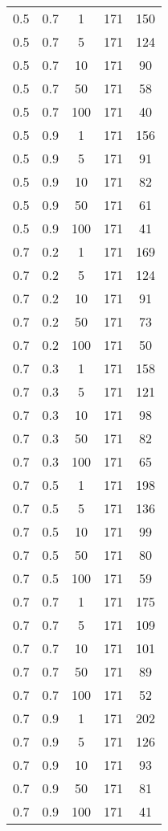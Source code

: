 \begin{appendices}
\begin{longtable}{|c|c|c|c|c|}
		0.5 & 0.7 & 1   & 171 & 150 \\
		0.5 & 0.7 & 5   & 171 & 124 \\
		0.5 & 0.7 & 10  & 171 & 90  \\
		0.5 & 0.7 & 50  & 171 & 58  \\
		0.5 & 0.7 & 100 & 171 & 40  \\ \hline
		0.5 & 0.9 & 1   & 171 & 156 \\
		0.5 & 0.9 & 5   & 171 & 91  \\
		0.5 & 0.9 & 10  & 171 & 82  \\
		0.5 & 0.9 & 50  & 171 & 61  \\
		0.5 & 0.9 & 100 & 171 & 41  \\ \hline
		0.7 & 0.2 & 1   & 171 & 169 \\
		0.7 & 0.2 & 5   & 171 & 124 \\
		0.7 & 0.2 & 10  & 171 & 91  \\
		0.7 & 0.2 & 50  & 171 & 73  \\
		0.7 & 0.2 & 100 & 171 & 50  \\ \hline
		0.7 & 0.3 & 1   & 171 & 158 \\
		0.7 & 0.3 & 5   & 171 & 121 \\
		0.7 & 0.3 & 10  & 171 & 98  \\
		0.7 & 0.3 & 50  & 171 & 82  \\
		0.7 & 0.3 & 100 & 171 & 65  \\ \hline
		0.7 & 0.5 & 1   & 171 & 198 \\
		0.7 & 0.5 & 5   & 171 & 136 \\
		0.7 & 0.5 & 10  & 171 & 99  \\
		0.7 & 0.5 & 50  & 171 & 80  \\
		0.7 & 0.5 & 100 & 171 & 59  \\ \hline
		0.7 & 0.7 & 1   & 171 & 175 \\
		0.7 & 0.7 & 5   & 171 & 109 \\
		0.7 & 0.7 & 10  & 171 & 101 \\
		0.7 & 0.7 & 50  & 171 & 89  \\
		0.7 & 0.7 & 100 & 171 & 52  \\ \hline
		0.7 & 0.9 & 1   & 171 & 202 \\
		0.7 & 0.9 & 5   & 171 & 126 \\
		0.7 & 0.9 & 10  & 171 & 93  \\
		0.7 & 0.9 & 50  & 171 & 81  \\
		0.7 & 0.9 & 100 & 171 & 41  \\ \hline

\end{longtable}
\end{appendices}
